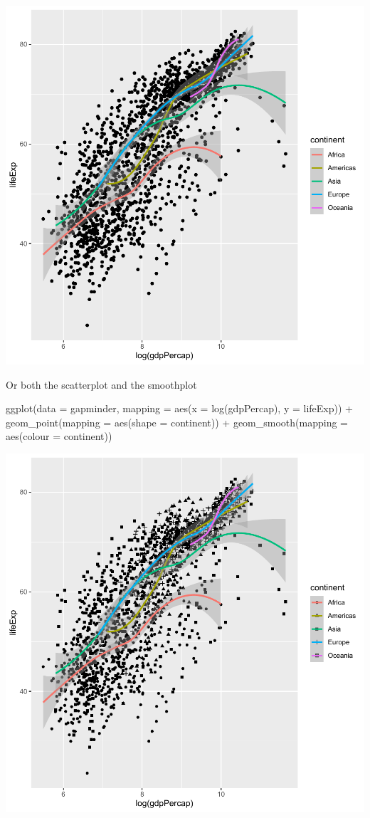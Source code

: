 \documentclass[
]{book}
\makeatletter
\newenvironment{Shaded}{\begin{snugshade}}{\end{snugshade}}
\newcommand{\AttributeTok}[1]{\textcolor[rgb]{0.61,0.61,0.61}{#1}}
\newcommand{\FunctionTok}[1]{\textcolor[rgb]{0,0,0}{#1}}
\newcommand{\NormalTok}[1]{#1}
\newcommand{\SpecialCharTok}[1]{\textcolor[rgb]{0,0,0}{#1}}
\newenvironment{kframe}{%
\medskip{}
\setlength{\fboxsep}{.8em}
 \def\at@end@of@kframe{}%
 \ifinner\ifhmode%
  \def\at@end@of@kframe{\end{minipage}}%
  \begin{minipage}{\columnwidth}%
 \fi\fi%
 \def\FrameCommand##1{\hskip\@totalleftmargin \hskip-\fboxsep
 \colorbox{shadecolor}{##1}\hskip-\fboxsep
     \hskip-\linewidth \hskip-\@totalleftmargin \hskip\columnwidth}%
 \MakeFramed {\advance\hsize-\width
   \@totalleftmargin\z@ \linewidth\hsize
   \@setminipage}}%
 {\par\unskip\endMakeFramed%
 \at@end@of@kframe}
\renewenvironment{Shaded}{\begin{kframe}}{\end{kframe}}
\makeatother
\begin{document}
\begin{center}\includegraphics[width=0.7\linewidth,keepaspectratio]{Multivariable_Data_Analysis_files/figure-latex/unnamed-chunk-32-1} \end{center}

Or both the scatterplot and the smoothplot

\begin{Shaded}
\begin{Highlighting}[]
\FunctionTok{ggplot}\NormalTok{(}\AttributeTok{data =}\NormalTok{ gapminder, }\AttributeTok{mapping =} \FunctionTok{aes}\NormalTok{(}\AttributeTok{x =} \FunctionTok{log}\NormalTok{(gdpPercap), }\AttributeTok{y =}\NormalTok{ lifeExp)) }\SpecialCharTok{+}
  \FunctionTok{geom\_point}\NormalTok{(}\AttributeTok{mapping =} \FunctionTok{aes}\NormalTok{(}\AttributeTok{shape =}\NormalTok{ continent)) }\SpecialCharTok{+}
  \FunctionTok{geom\_smooth}\NormalTok{(}\AttributeTok{mapping =} \FunctionTok{aes}\NormalTok{(}\AttributeTok{colour =}\NormalTok{ continent))}
\end{Highlighting}
\end{Shaded}

\begin{center}\includegraphics[width=0.7\linewidth,keepaspectratio]{Multivariable_Data_Analysis_files/figure-latex/unnamed-chunk-33-1} \end{center}
\end{document}
